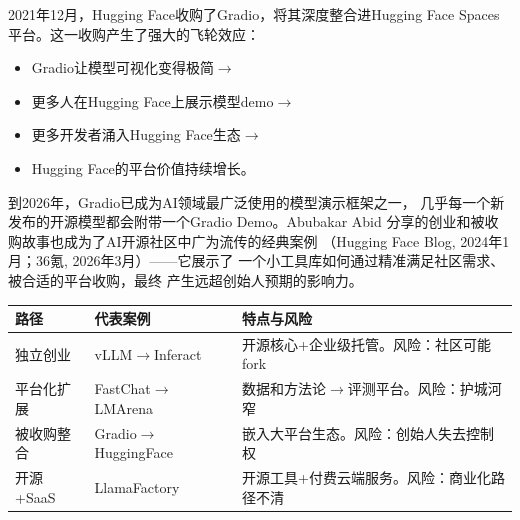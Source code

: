 2021年12月，Hugging Face收购了Gradio，将其深度整合进Hugging Face
Spaces平台。这一收购产生了强大的飞轮效应：
\begin{itemize}
  \item Gradio让模型可视化变得极简$\to$
  \item 更多人在Hugging Face上展示模型demo$\to$
  \item 更多开发者涌入Hugging Face生态$\to$
  \item Hugging Face的平台价值持续增长。
\end{itemize}

到2026年，Gradio已成为AI领域最广泛使用的模型演示框架之一，
几乎每一个新发布的开源模型都会附带一个Gradio Demo。Abubakar Abid
分享的创业和被收购故事也成为了AI开源社区中广为流传的经典案例
（Hugging Face Blog, 2024年1月；36氪, 2026年3月）——它展示了
一个小工具库如何通过精准满足社区需求、被合适的平台收购，最终
产生远超创始人预期的影响力。

\begin{keybox}[开源$\to$商业化的四种路径]
\small
\begin{tabularx}{\textwidth}{l l X}
\toprule
\rowcolor{figLightGray}
\textbf{路径} & \textbf{代表案例} & \textbf{特点与风险} \\
\midrule
独立创业      & vLLM$\to$Inferact      & 开源核心+企业级托管。风险：社区可能fork \\
平台化扩展    & FastChat$\to$LMArena   & 数据和方法论$\to$评测平台。风险：护城河窄 \\
被收购整合    & Gradio$\to$HuggingFace & 嵌入大平台生态。风险：创始人失去控制权 \\
开源+SaaS    & LlamaFactory           & 开源工具+付费云端服务。风险：商业化路径不清 \\
\bottomrule
\end{tabularx}
\end{keybox}

